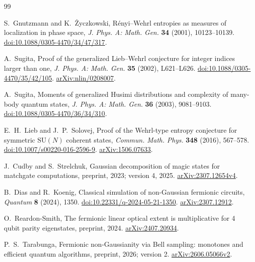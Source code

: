 \begingroup
\small
\begin{thebibliography}{99}
\setlength{\itemsep}{3pt}
\setlength{\parsep}{0pt}
\raggedright

S.~Gnutzmann and K.~\.{Z}yczkowski,
R\'enyi--Wehrl entropies as measures of localization in phase space,
\emph{J. Phys. A: Math. Gen.} \textbf{34} (2001), 10123--10139.
\href{https://doi.org/10.1088/0305-4470/34/47/317}{doi:10.1088/0305-4470/34/47/317}.

A.~Sugita,
Proof of the generalized Lieb--Wehrl conjecture for integer indices larger than one,
\emph{J. Phys. A: Math. Gen.} \textbf{35} (2002), L621--L626.
\href{https://doi.org/10.1088/0305-4470/35/42/105}{doi:10.1088/0305-4470/35/42/105}.
\href{https://arxiv.org/abs/nlin/0208007}{arXiv:nlin/0208007}.

A.~Sugita,
Moments of generalized Husimi distributions and complexity of many-body quantum states,
\emph{J. Phys. A: Math. Gen.} \textbf{36} (2003), 9081--9103.
\href{https://doi.org/10.1088/0305-4470/36/34/310}{doi:10.1088/0305-4470/36/34/310}.

E.~H.~Lieb and J.~P.~Solovej,
Proof of the Wehrl-type entropy conjecture for symmetric $\mathrm{SU}(N)$ coherent states,
\emph{Commun. Math. Phys.} \textbf{348} (2016), 567--578.
\href{https://doi.org/10.1007/s00220-016-2596-9}{doi:10.1007/s00220-016-2596-9}.
\href{https://arxiv.org/abs/1506.07633}{arXiv:1506.07633}.

J.~Cudby and S.~Strelchuk,
Gaussian decomposition of magic states for matchgate computations,
preprint, 2023; version 4, 2025.
\href{https://arxiv.org/abs/2307.12654v4}{arXiv:2307.12654v4}.

B.~Dias and R.~Koenig,
Classical simulation of non-Gaussian fermionic circuits,
\emph{Quantum} \textbf{8} (2024), 1350.
\href{https://doi.org/10.22331/q-2024-05-21-1350}{doi:10.22331/q-2024-05-21-1350}.
\href{https://arxiv.org/abs/2307.12912}{arXiv:2307.12912}.

O.~Reardon-Smith,
The fermionic linear optical extent is multiplicative for 4 qubit parity eigenstates,
preprint, 2024.
\href{https://arxiv.org/abs/2407.20934}{arXiv:2407.20934}.

P.~S.~Tarabunga,
Fermionic non-Gaussianity via Bell sampling: monotones and efficient quantum algorithms,
preprint, 2026; version 2.
\href{https://arxiv.org/abs/2606.05066v2}{arXiv:2606.05066v2}.


\end{thebibliography}
